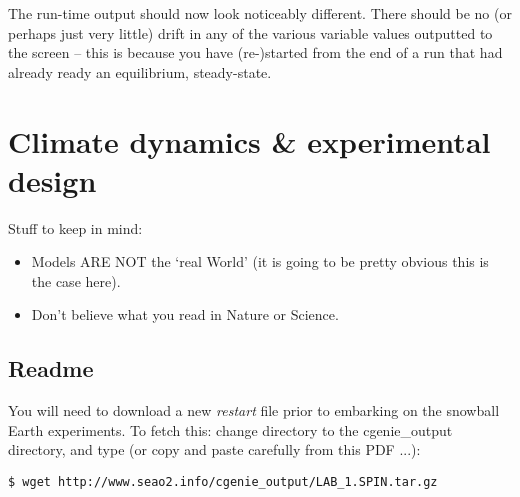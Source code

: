 \documentclass[11pt,fleqn]{book} %
\begin{document}
The run-time output should now look noticeably different. There should be no (or perhaps just very little) drift in any of the various variable values outputted to the screen – this is because you have (re-)started from the end of a run that had already ready an equilibrium, steady-state.


\cleardoublepage


\chapter{Climate dynamics \& experimental design}\label{ch:climate-dynamics}

\hfill \break

\noindent Stuff to keep in mind:

\begin{itemize}
\vspace{1mm}
\item Models ARE NOT the ‘real World’ (it is going to be pretty obvious this is the case here).
\vspace{1mm}
\item Don’t believe what you read in Nature or Science.
\end{itemize}


\newpage


\section*{Readme}

You will need to download a new \textit{restart} file prior to embarking on the snowball Earth experiments.
To fetch this: change directory to the \textsf{\footnotesize cgenie\_output} directory, and type (or copy and paste carefully from this PDF ...):
\vspace{-2mm}
\begin{verbatim}
$ wget http://www.seao2.info/cgenie_output/LAB_1.SPIN.tar.gz
\end{verbatim}
\vspace{-2mm}
\end{document}
